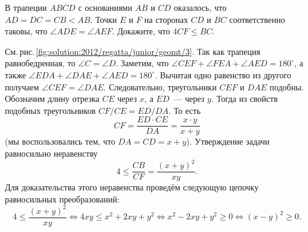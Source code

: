 \problem
В трапеции $ABCD$ с основаниями $AB$ и $CD$ оказалось, что $AD = DC = CB < AB$.
Точки $E$ и $F$ на сторонах $CD$ и $BC$ соответственно таковы, что
$\angle ADE = \angle AEF$.
Докажите, что $4 CF \leq BC$.

%
\label{solution:2012/regatta/junior/geomt/3}%
См.\,рис.\,\ref{fig:solution:2012/regatta/junior/geomt/3}.
Так как трапеция равнобедренная, то $\angle C = \angle D$.
Заметим, что
$\angle CEF + \angle FEA + \angle AED = 180^\circ$, а также
$\angle EDA + \angle DAE + \angle AED = 180^\circ$.
Вычитая одно равенство из другого получаем $\angle CEF = \angle DAE$.
Следовательно, треугольники $CEF$ и $DAE$ подобны.
Обозначим длину отрезка $CE$ через $x$, а $ED$~--- через $y$.
Тогда из свойств подобных треугольников $CF / CE = ED / DA$.
То есть
\[
    CF = \frac{ED \cdot CE}{DA} = \frac{x \cdot y}{x + y}
\]
(мы воспользовались тем, что $DA = CD = x + y$).
Утверждение задачи равносильно неравенству
\[
    4 \leq \frac{CB}{CF} = \frac{(x + y)^2}{xy}
.\]
Для доказательства этого неравенства проведём следующую цепочку равносильных
преобразований:
\[
    4 \leq \frac{(x + y)^2}{xy}
\Leftrightarrow
    4 x y \leq x^2 + 2 x y + y^2
\Leftrightarrow
    x^2 - 2 x y + y^2 \geq 0
\Leftrightarrow
    (x - y)^2 \geq 0
.\]

\endproblem
